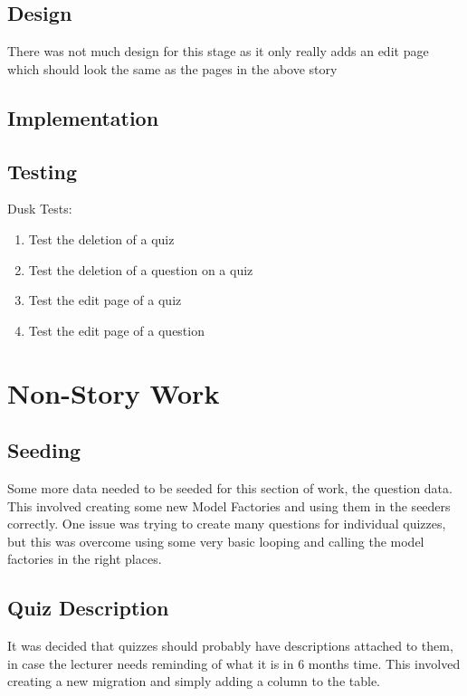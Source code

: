 \documentclass{article}
\begin{document}
\subsection{Design}
There was not much design for this stage as it only really adds an edit page which should look the same as the pages in the above story
\subsection{Implementation}
\subsection{Testing}
Dusk Tests:
\begin{enumerate}
	\item Test the deletion of a quiz
	\item Test the deletion of a question on a quiz
	\item Test the edit page of a quiz
	\item Test the edit page of a question
\end{enumerate}
\newpage

\section{Non-Story Work}
\subsection{Seeding}
Some more data needed to be seeded for this section of work, the question data. This involved creating some new Model Factories and using them in the seeders correctly. One issue was trying to create many questions for individual quizzes, but this was overcome using some very basic looping and calling the model factories in the right places.
\subsection{Quiz Description}
It was decided that quizzes should probably have descriptions attached to them, in case the lecturer needs reminding of what it is in 6 months time. This involved creating a new migration and simply adding a column to the table.

%
%
\end{document}

